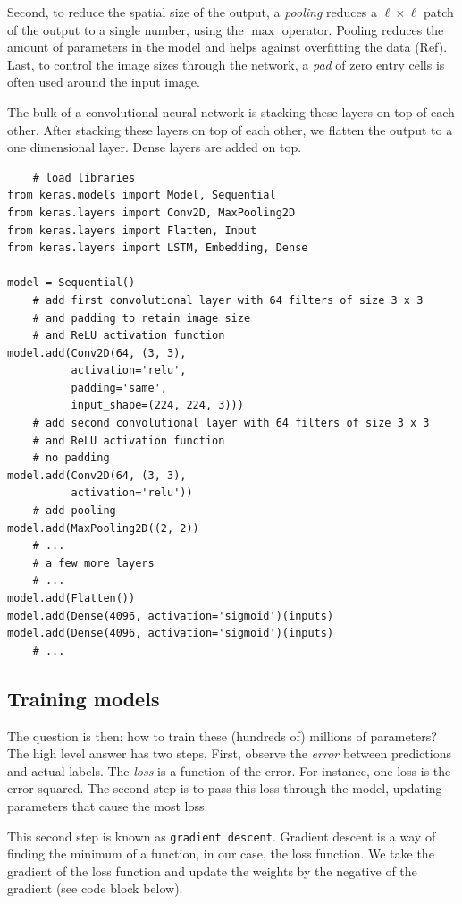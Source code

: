 \documentclass[12pt, a4paper, oneside, headinclude, footinclude]{article}
\begin{document}
Second, to reduce the spatial size of the output, a \textit{pooling} reduces a
$\ell\times\ell$ patch of the output to a single number, using the $\max$
operator. Pooling reduces the amount of parameters in the model and helps
against overfitting the data (Ref). Last, to control the image sizes through
the network, a \textit{pad} of zero entry cells is often used around the input
image. 

The bulk of a convolutional neural network is stacking these layers on top of
each other. After stacking these layers on top of each other, we flatten the
output to a one dimensional layer. Dense layers are added on top. 

\begin{verbatim}
    # load libraries
from keras.models import Model, Sequential
from keras.layers import Conv2D, MaxPooling2D
from keras.layers import Flatten, Input
from keras.layers import LSTM, Embedding, Dense

model = Sequential()
    # add first convolutional layer with 64 filters of size 3 x 3
    # and padding to retain image size
    # and ReLU activation function
model.add(Conv2D(64, (3, 3), 
          activation='relu', 
          padding='same', 
          input_shape=(224, 224, 3)))
    # add second convolutional layer with 64 filters of size 3 x 3
    # and ReLU activation function
    # no padding
model.add(Conv2D(64, (3, 3), 
          activation='relu'))
    # add pooling
model.add(MaxPooling2D((2, 2))
    # ...
    # a few more layers
    # ...
model.add(Flatten())
model.add(Dense(4096, activation='sigmoid')(inputs)
model.add(Dense(4096, activation='sigmoid')(inputs)
    # ...

\end{verbatim}

\subsection{Training models}

The question is then: how to train these (hundreds of) millions of parameters?
The high level answer has two steps. First, observe the \textit{error}
between predictions and actual labels. The \textit{loss} is a function of the
error. For instance, one loss is the error squared. The second step is to pass
this loss through the model, updating parameters that cause the most loss.

This second step is known as \texttt{gradient descent}. Gradient descent is a
way of finding the minimum of a function, in our case, the loss function. We
take the gradient of the loss function and update the weights by the negative
of the gradient (see code block below). 
\end{document}
